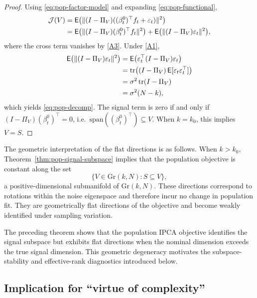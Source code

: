 \documentclass[twoside,11pt,letter]{article}
\begin{document}
\begin{proof}
Using \eqref{eq:pop-factor-model} and expanding \eqref{eq:pop-functional},
\begin{equation*}
\begin{split}
{\mathcal{J}}(V)&=\mathsf{E}\big(\|(I-\Pi_V)((\beta_t^0)^\top f_t+\varepsilon_t)\|^2\big)\\
&=\mathsf{E}\big(\|(I-\Pi_V)(\beta_t^0)^\top f_t\|^2\big)+\mathsf{E}\big(\|(I-\Pi_V)\varepsilon_t\|^2\big),
\end{split}
\end{equation*}
where the cross term vanishes by \ref{A3}. Under \ref{A1},
\begin{equation*}
\begin{split}
\mathsf{E}\big(\|(I-\Pi_V)\varepsilon_t\|^2\big)&=\mathsf{E}\big(\varepsilon_t^\top (I-\Pi_V)\varepsilon_t\big)\\
&=\mathrm{tr}\bigl((I-\Pi_V)\,\mathsf{E}[\varepsilon_t\varepsilon_t^\top]\bigr)\\
&=\sigma^2\,\mathrm{tr}(I-\Pi_V)\\
&=\sigma^2(N-k),
\end{split}
\end{equation*}
which yields \eqref{eq:pop-decomp}. The signal term is zero if and only if $(I-\Pi_V)(\beta_t^0)^\top=0$, i.e.\ $\mathrm{span}((\beta_t^0)^\top)\subseteq V$. When $k=k_0$, this implies $V=S$.
\end{proof}

The geometric interpretation of the flat directions is as follows. When $k>k_0$, Theorem~\ref{thm:pop-signal-subspace} implies that the population objective
is constant along the set
\begin{equation*}
\{V\in \mathrm{Gr}(k,N): S\subseteq V\},
\end{equation*}
a positive-dimensional submanifold of $\mathrm{Gr}(k,N)$. These directions correspond to rotations within the noise eigenspace and therefore incur no change in population fit. They are geometrically flat directions of the objective and become weakly identified under sampling variation.

The preceding theorem shows that the population IPCA objective identifies the signal subspace but exhibits flat directions when the nominal dimension exceeds the true signal dimension. This geometric degeneracy motivates the subspace-stability and effective-rank diagnostics introduced below.

\subsection{Implication for ``virtue of complexity''}
\end{document}

